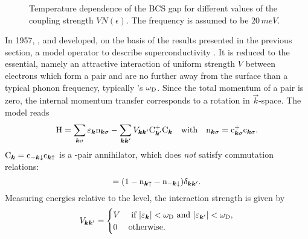 \begin{figure}
    \small
    
    \caption{
        Temperature dependence of the BCS gap for different values of the
        coupling strength $V N(\epsilon)$. The  frequency is assumed
        to be $20 \, \unit{meV}$.}
    \label{BCS gap}
\end{figure}
%
In 1957, ,  and  developed, on the
basis of the results presented in the previous section, a model 
operator to describe superconductivity \cites {BardeenCooperSchrieffer57a}
{BardeenCooperSchrieffer57b}. It is reduced to the essential, namely an
attractive interaction of uniform strength $V$ between electrons which form a
 pair and are no further away from the  surface than a
typical phonon frequency, typically 's $\omega \sb{\text{D}}$. Since the
total momentum of a  pair is zero, the internal momentum transfer
corresponds to a rotation in $\vec k$-space. The model reads
%
\begin{equation*}
    \mathrm H = \sum_{\boldsymbol k \sigma} \varepsilon_{\boldsymbol k} \mathrm n_{\boldsymbol k \sigma}
    - \sum_{\boldsymbol k \boldsymbol k'} V_{\boldsymbol k \boldsymbol k'} \mathrm C_{\boldsymbol k'}^+ \mathrm C_{\boldsymbol k}
    \quad \text{with} \quad
    \mathrm n_{\boldsymbol k \sigma} = \mathrm c_{\boldsymbol k \sigma}^+ \mathrm c_{\boldsymbol k \sigma}.
\end{equation*}
%
$\mathrm C_{\boldsymbol k} = \mathrm c_{-\boldsymbol k \downarrow} \mathrm c_{\boldsymbol k \uparrow}$ is a
-pair annihilator, which does \emph{not} satisfy 
commutation relations:
%
\begin{equation*}
    [\op C_{\vec k}, \op C_{\vec k'}^+]
    = (1 - \op n_{\vec k \up} - \op n_{-\vec k \down}) \delta_{\vec k \vec k'}.
\end{equation*}
%
Measuring energies relative to the  level, the interaction strength
is given by
%
\begin{equation*}
    V_{\boldsymbol k \boldsymbol k'} = \begin{cases}
        V & \text{
             if $|\varepsilon_{\boldsymbol k }| < \omega \sb{\text{D}}$
            and $|\varepsilon_{\boldsymbol k'}| < \omega \sb{\text{D}}$,} \\
        0 & \text{otherwise.}
    \end{cases}
\end{equation*}

